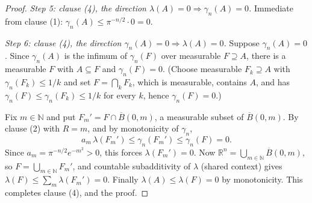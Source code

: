 \begin{proof}
\emph{Step 5: clause (4), the direction $\lambda(A) = 0 \Rightarrow
\gamma_n(A) = 0$.}
Immediate from clause (1): $\gamma_n(A) \leq \pi^{-n/2}\cdot 0 = 0$.

\emph{Step 6: clause (4), the direction $\gamma_n(A) = 0 \Rightarrow
\lambda(A) = 0$.}
Suppose $\gamma_n(A) = 0$.  Since $\gamma_n(A)$ is the infimum of $\gamma_n(F)$
over measurable $F \supseteq A$, there is a measurable $F$ with $A \subseteq F$
and $\gamma_n(F) = 0$.  (Choose measurable $F_k \supseteq A$ with
$\gamma_n(F_k) \leq 1/k$ and set $F = \bigcap_kF_k$, which is measurable,
contains $A$, and has $\gamma_n(F) \leq \gamma_n(F_k) \leq 1/k$ for every $k$,
hence $\gamma_n(F) = 0$.)

Fix $m \in \mathbb{N}$ and put $F_m' = F \cap \overline B(0,m)$, a measurable
subset of $\overline B(0,m)$.  By clause (2) with $R = m$, and by monotonicity
of $\gamma_n$,
\[
  a_m\,\lambda(F_m') \leq \gamma_n(F_m') \leq \gamma_n(F) = 0 .
\]
Since $a_m = \pi^{-n/2}e^{-m^2} > 0$, this forces $\lambda(F_m') = 0$.  Now
$\mathbb{R}^n = \bigcup_{m\in\mathbb{N}}\overline B(0,m)$, so
$F = \bigcup_{m\in\mathbb{N}}F_m'$, and countable subadditivity of $\lambda$
(shared context) gives $\lambda(F) \leq \sum_m\lambda(F_m') = 0$.  Finally
$\lambda(A) \leq \lambda(F) = 0$ by monotonicity.  This completes clause (4),
and the proof.
\end{proof}
